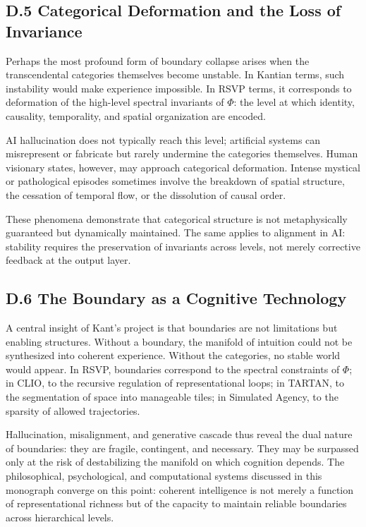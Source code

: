 \documentclass[12pt]{article}
\begin{document}
\subsection*{D.5 Categorical Deformation and the Loss of Invariance}

Perhaps the most profound form of boundary collapse arises when the 
transcendental categories themselves become unstable. In Kantian terms, such 
instability would make experience impossible. In RSVP terms, it corresponds to 
deformation of the high-level spectral invariants of $\Phi$: the level at which 
identity, causality, temporality, and spatial organization are encoded.

AI hallucination does not typically reach this level; artificial systems can 
misrepresent or fabricate but rarely undermine the categories themselves.  
Human visionary states, however, may approach categorical deformation. Intense 
mystical or pathological episodes sometimes involve the breakdown of spatial 
structure, the cessation of temporal flow, or the dissolution of causal order.

These phenomena demonstrate that categorical structure is not metaphysically 
guaranteed but dynamically maintained. The same applies to alignment in AI: 
stability requires the preservation of invariants across levels, not merely 
corrective feedback at the output layer.

\subsection*{D.6 The Boundary as a Cognitive Technology}

A central insight of Kant’s project is that boundaries are not limitations 
but enabling structures. Without a boundary, the manifold of intuition could 
not be synthesized into coherent experience. Without the categories, no stable 
world would appear. In RSVP, boundaries correspond to the spectral constraints 
of $\Phi$; in CLIO, to the recursive regulation of representational loops; in 
TARTAN, to the segmentation of space into manageable tiles; in Simulated 
Agency, to the sparsity of allowed trajectories.

Hallucination, misalignment, and generative cascade thus reveal the dual 
nature of boundaries: they are fragile, contingent, and necessary. They may be 
surpassed only at the risk of destabilizing the manifold on which cognition 
depends. The philosophical, psychological, and computational systems discussed 
in this monograph converge on this point: coherent intelligence is not merely 
a function of representational richness but of the capacity to maintain 
reliable boundaries across hierarchical levels.
\end{document}
